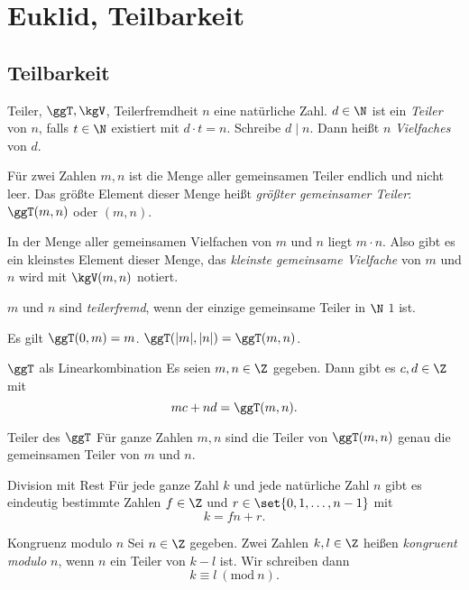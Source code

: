 \section{Euklid, Teilbarkeit}

\subsection{Teilbarkeit}

\begin{karte}{Teiler, \(\ggT, \kgV\), Teilerfremdheit}
    \(n\) eine natürliche Zahl. \(d\in \N\) ist ein \textit{Teiler} 
    von \(n\), falls \(t\in \N\) existiert mit \(d\cdot t = n\). Schreibe \(d \;|\; n\).
    Dann heißt \(n\) \textit{Vielfaches} von \(d\).

    Für zwei Zahlen \(m,n\) ist die Menge aller gemeinsamen Teiler endlich 
    und nicht leer. Das größte Element dieser Menge heißt 
    \textit{größter gemeinsamer Teiler}: \(\ggT(m,n)\) oder \((m,n)\).

    In der Menge aller gemeinsamen Vielfachen von \(m\) und \(n\) 
    liegt \(m\cdot n\). Also gibt es ein kleinstes Element dieser Menge, 
    das \textit{kleinste gemeinsame Vielfache} von \(m\) und \(n\) 
    wird mit \(\kgV(m,n)\) notiert. 

    \(m\) und \(n\) sind \textit{teilerfremd}, wenn der einzige gemeinsame Teiler 
    in \(\N\) \(1\) ist.

    Es gilt \(\ggT(0,m) = m\). \(\ggT(|m|,|n|) = \ggT(m,n)\).
\end{karte}

\begin{karte}{\(\ggT\) als Linearkombination}
    Es seien \(m,n\in \Z\) gegeben. Dann gibt es \(c,d\in \Z\) mit 
    \[ mc+nd=\ggT(m,n). \]
\end{karte}

\begin{karte}{Teiler des \(\ggT\)}
    Für ganze Zahlen \(m,n\) sind die Teiler von \(\ggT(m,n)\) genau die gemeinsamen 
    Teiler von \(m\) und \(n\).
\end{karte}

\begin{karte}{Division mit Rest}
    Für jede ganze Zahl \(k\) und jede natürliche Zahl \(n\) gibt es 
    eindeutig bestimmte Zahlen \(f\in \Z\) und \(r\in \set{0,1,\ldots, n-1}\) mit 
    \[ k=fn+r. \]
\end{karte}

\begin{karte}{Kongruenz modulo \(n\)}
    Sei \(n\in\Z\) gegeben. Zwei Zahlen \(k,l\in \Z\) heißen 
    \textit{kongruent modulo} \(n\), wenn \(n\) ein Teiler von \(k-l\) ist. 
    Wir schreiben dann 
    \[ k\equiv l\ (\mathrm{mod}\ n). \]
\end{karte}

